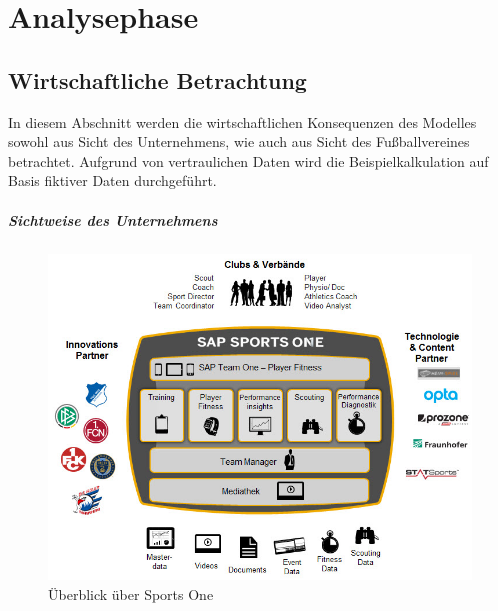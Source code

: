 \chapter{Analysephase}




\section{Wirtschaftliche Betrachtung}
\label{wa}
In diesem Abschnitt werden die wirtschaftlichen Konsequenzen des Modelles sowohl aus Sicht des Unternehmens, wie auch aus Sicht des Fußballvereines betrachtet.\enlargethispage{2\baselineskip}  Aufgrund von vertraulichen Daten wird die Beispielkalkulation auf Basis fiktiver Daten durchgeführt.

\paragraph{Sichtweise des Unternehmens}

\begin{figure}[H]
\centering
\includegraphics[scale=0.575]{se-wa-jpg/sportsone}
\caption{Überblick über Sports One}
\label{sportsone}
\end{figure}


